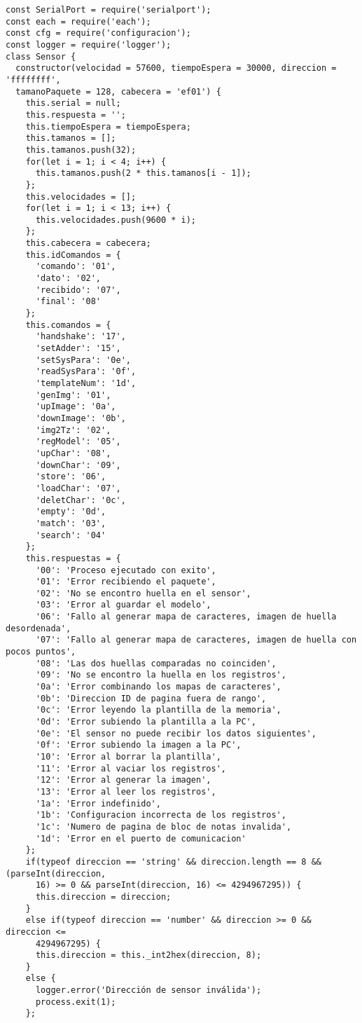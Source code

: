 \begin{lstlisting}[label=anx:libreria_zfm20]
const SerialPort = require('serialport');
const each = require('each');
const cfg = require('configuracion');
const logger = require('logger');
class Sensor {
  constructor(velocidad = 57600, tiempoEspera = 30000, direccion = 'ffffffff',
  tamanoPaquete = 128, cabecera = 'ef01') {
    this.serial = null;
    this.respuesta = '';
    this.tiempoEspera = tiempoEspera;
    this.tamanos = [];
    this.tamanos.push(32);
    for(let i = 1; i < 4; i++) {
      this.tamanos.push(2 * this.tamanos[i - 1]);
    };
    this.velocidades = [];
    for(let i = 1; i < 13; i++) {
      this.velocidades.push(9600 * i);
    };
    this.cabecera = cabecera;
    this.idComandos = {
      'comando': '01',
      'dato': '02',
      'recibido': '07',
      'final': '08'
    };
    this.comandos = {
      'handshake': '17',
      'setAdder': '15',
      'setSysPara': '0e',
      'readSysPara': '0f',
      'templateNum': '1d',
      'genImg': '01',
      'upImage': '0a',
      'downImage': '0b',
      'img2Tz': '02',
      'regModel': '05',
      'upChar': '08',
      'downChar': '09',
      'store': '06',
      'loadChar': '07',
      'deletChar': '0c',
      'empty': '0d',
      'match': '03',
      'search': '04'
    };
    this.respuestas = {
      '00': 'Proceso ejecutado con exito',
      '01': 'Error recibiendo el paquete',
      '02': 'No se encontro huella en el sensor',
      '03': 'Error al guardar el modelo',
      '06': 'Fallo al generar mapa de caracteres, imagen de huella desordenada',
      '07': 'Fallo al generar mapa de caracteres, imagen de huella con pocos puntos',
      '08': 'Las dos huellas comparadas no coinciden',
      '09': 'No se encontro la huella en los registros',
      '0a': 'Error combinando los mapas de caracteres',
      '0b': 'Direccion ID de pagina fuera de rango',
      '0c': 'Error leyendo la plantilla de la memoria',
      '0d': 'Error subiendo la plantilla a la PC',
      '0e': 'El sensor no puede recibir los datos siguientes',
      '0f': 'Error subiendo la imagen a la PC',
      '10': 'Error al borrar la plantilla',
      '11': 'Error al vaciar los registros',
      '12': 'Error al generar la imagen',
      '13': 'Error al leer los registros',
      '1a': 'Error indefinido',
      '1b': 'Configuracion incorrecta de los registros',
      '1c': 'Numero de pagina de bloc de notas invalida',
      '1d': 'Error en el puerto de comunicacion'
    };
    if(typeof direccion == 'string' && direccion.length == 8 && (parseInt(direccion,
      16) >= 0 && parseInt(direccion, 16) <= 4294967295)) {
      this.direccion = direccion;
    }
    else if(typeof direccion == 'number' && direccion >= 0 && direccion <=
      4294967295) {
      this.direccion = this._int2hex(direccion, 8);
    }
    else {
      logger.error('Dirección de sensor inválida');
      process.exit(1);
    };


\end{lstlisting}
